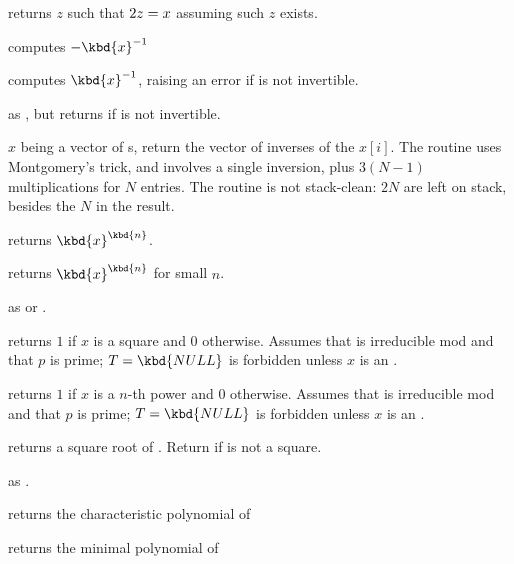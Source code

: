  returns $z$ such that $2\*z = x$
assuming such $z$ exists.



 computes $-\kbd{x}^{-1}$

 computes $\kbd{x}^{-1}$, raising an
error if  is not invertible.

 as , but returns
 if  is not invertible.


 $x$ being a vector of s,
return the vector of inverses of the $x[i]$. The routine uses Montgomery's
trick, and involves a single inversion, plus $3(N-1)$ multiplications for
$N$ entries. The routine is not stack-clean: $2N$  are left on
stack, besides the $N$ in the result.

 returns $\kbd{x}^\kbd{n}$.

 returns $\kbd{x}^\kbd{n}$
for small $n$.

 as
 or .

 returns $1$ if $x$ is a square
and $0$ otherwise. Assumes that  is irreducible mod  and that
$p$ is prime; $T = \kbd{NULL}$ is forbidden unless $x$ is an .

 returns $1$ if $x$
is a $n$-th power and $0$ otherwise. Assumes that  is irreducible mod
 and that $p$ is prime; $T = \kbd{NULL}$ is forbidden unless $x$ is an
.

 returns a square root of .
Return  if  is not a square.

as .

 returns the characteristic
polynomial of 

 returns the minimal polynomial
of 

